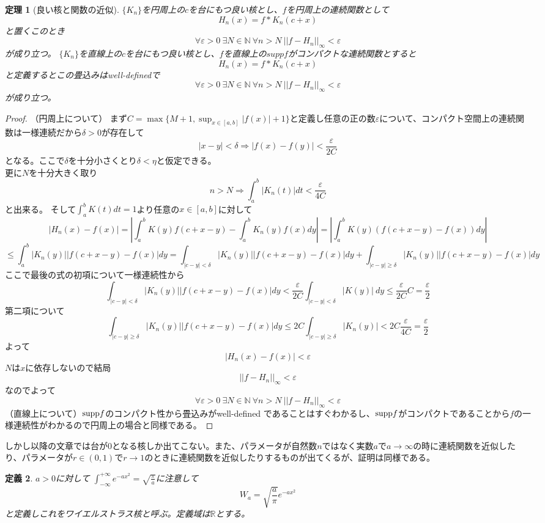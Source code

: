 \documentclass[leqno]{jsarticle}
\newtheorem{theorem}{定理}
\newtheorem{defnition}[theorem]{定義}
\newcommand{\rr}{\mathbb{R}}
\newcommand{\supp}{\text{{\rm supp}}}
\newcommand{\mgn}{\infty}
\begin{document}
\begin{theorem}[良い核と関数の近似]\label{daiji}
$\{K_n\}$を円周上の$c$を台にもつ良い核とし、$f$を円周上の連続関数として
\[
H_n(x)=f*K_n(c+x)
\]
と置くこのとき
\[
\forall \varepsilon>0\ \exists N\in\mathbb{N}\ \forall n>N\ ||f-H_n||_{\infty}<\varepsilon
\]が成り立つ。
$\{K_n\}$を直線上の$c$を台にもつ良い核とし、$f$を直線上の$suppf$がコンパクトな連続関数とすると
\[
H_n(x)=f*K_n(c+x)
\]
と定義するとこの畳込みはwell-definedで
\[
\forall \varepsilon>0\ \exists N\in\mathbb{N}\ \forall n>N\ ||f-H_n||_{\infty}<\varepsilon
\]が成り立つ。
\end{theorem}

\begin{proof}（円周上について）
まず$C=\max\{M+1,\sup_{x\in[a,b]}|f(x)|+1\}$と定義し任意の正の数$\varepsilon$について、コンパクト空間上の連続関数は一様連続だから$\delta>0$が存在して
\[
|x-y|<\delta\Rightarrow |f(x)-f(y)|<\frac{\varepsilon}{2C}
\]
となる。ここで$\delta$を十分小さくとり$\delta<\eta$と仮定できる。\\ 
更に$N$を十分大きく取り
\[
n>N\Rightarrow \int_a^b|K_n(t)|dt<\frac{\varepsilon}{4C}
\]
と出来る。
そして$\int_a^bK(t)dt=1$より任意の$x\in [a,b]$に対して
\[
|H_n(x)-f(x)|=\left|\int_a^bK(y)f(c+x-y)-\int_a^bK_n(y)f(x)dy\right|=\left|\int_a^bK(y)(f(c+x-y)-f(x))dy\right|
\]
\[
\le \int_a^b|K_n(y)||f(c+x-y)-f(x)|dy=\int_{|c-y|<\delta}|K_n(y)||f(c+x-y)-f(x)|dy+\int_{|c-y|\ge \delta}|K_n(y)||f(c+x-y)-f(x)|dy
\]
ここで最後の式の初項について一様連続性から
\[
\int_{|c-y|<\delta}|K_n(y)||f(c+x-y)-f(x)|dy<\frac{\varepsilon}{2C}\int_{|c-y|<\delta}|K(y)|\ dy\le\frac{\varepsilon}{2C}C=\frac{\varepsilon}{2}
\]
第二項について
\[
\int_{|c-y|\ge \delta}|K_n(y)||f(c+x-y)-f(x)|dy\le 2C\int_{|c-y|\ge \delta}|K_n(y)|<2C\frac{\varepsilon}{4C}=\frac{\varepsilon}{2}
\]
よって
\[
|H_n(x)-f(x)|<\varepsilon
\]
$N$は$x$に依存しないので結局
\[
||f-H_n||_{\infty}<\varepsilon
\]
なのでよって
\[
\forall \varepsilon>0\ \exists N\in\mathbb{N}\ \forall n>N\ ||f-H_n||_{\infty}<\varepsilon
\]
（直線上について）$\supp f$のコンパクト性から畳込みがwell-defined であることはすぐわかるし、$\supp f$がコンパクトであることから$f$の一様連続性がわかるので円周上の場合と同様である。
\end{proof}

しかし以降の文章では台が$0$となる核しか出てこない。また、パラメータが自然数$n$ではなく実数$a$で$a\to \mgn$の時に連続関数を近似したり、パラメータが$r\in (0,1)$で$r\to 1$のときに連続関数を近似したりするものが出てくるが、証明は同様である。

\begin{defnition}
$a>0$に対して
$\displaystyle \int_{-\infty}^{+\infty}e^{-ax^2}=\sqrt{\frac{\pi}{a}}$に注意して
\[
W_{a}=\sqrt{\frac{a}{\pi}}e^{-ax^2}
\]と定義しこれをワイエルストラス核と呼ぶ。定義域は$\rr$とする。
\end{defnition}
\end{document}
